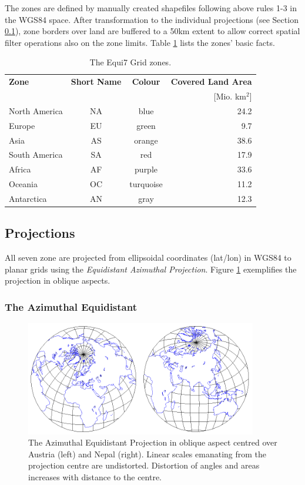 \documentclass[11pt,a4paper]{article}
\begin{document}
The zones are defined by manually created shapefiles following above rules 1-3 in the WGS84 space. After transformation to the individual projections (see Section \ref{sub:projections}), zone borders over land are buffered to a 50km extent to allow correct spatial filter operations also on the zone limits. Table \ref{tab:zones} lists the zones' basic facts. 

\begin{table}[hbtp]
\centering
	{
	\begin{tabular}{lccr}
	\textbf{Zone} & \textbf{Short Name} & \textbf{Colour} & \textbf{Covered Land Area} \\
	& & & [Mio. km$^{2}$] \\
	\hline
	North America & NA & blue & 24.2 \\
	Europe & EU & green & 9.7 \\
	Asia & AS & orange & 38.6 \\
	South America & SA & red & 17.9 \\
	Africa & AF & purple & 33.6 \\
	Oceania & OC & turquoise & 11.2 \\
	Antarctica & AN & gray & 12.3 \\
	\hline
	\end{tabular} 
	}
\caption[Zone Facts]{
The Equi7 Grid zones.
}
\label{tab:zones}
\end{table}

\newpage

\subsection{Projections}
\label{sub:projections}

All seven zone are projected from ellipsoidal coordinates (lat/lon) in WGS84 to planar grids using the \textit{Equidistant Azimuthal Projection}. Figure \ref{fig:equi_azi} exemplifies the projection in oblique aspects. 

\subsubsection{The Azimuthal Equidistant}

\begin{figure}[hbtp]
\centering
\includegraphics[width=0.9\textwidth]{equi_azi}
\caption{
The Azimuthal Equidistant Projection in oblique aspect centred over Austria (left) and Nepal (right). Linear scales emanating from the projection centre are undistorted. Distortion of angles and areas increases with distance to the centre.
}
\label{fig:equi_azi}
\end{figure}
\end{document}
